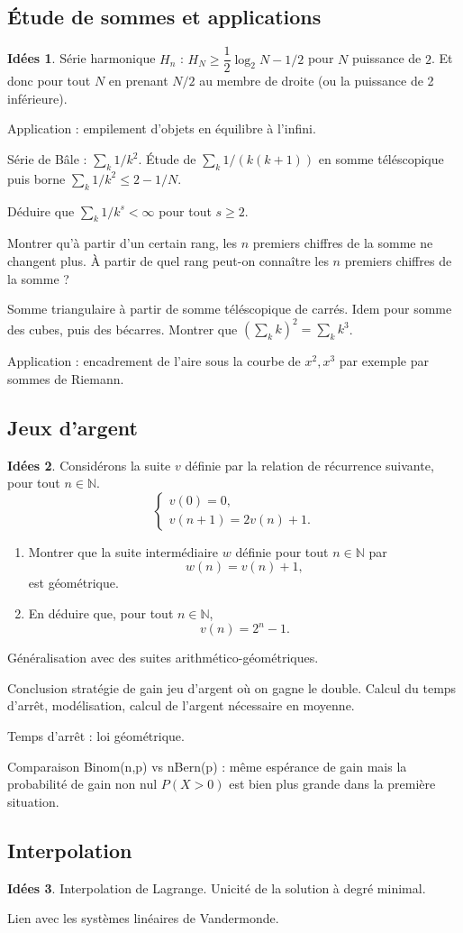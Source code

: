 \documentclass[a4paper,12pt, notitlepage]{article}
\theoremstyle{definition}
\newtheorem{idee}{Idées}
\newcommand{\N}{\mathbb{N}}
\begin{document}
\subsection{Étude de sommes et applications}

\begin{idee}	
	Série harmonique $H_n$ : $H_N \geq \dfrac12 \log_2N - 1/2$ pour $N$ puissance de $2$.
	Et donc pour tout $N$ en prenant $N/2$ au membre de droite (ou la puissance de 2 inférieure).
	
	Application : empilement d'objets en équilibre à l'infini.
	
	Série de Bâle : $\sum_k 1/k^2$. Étude de $\sum_k 1/(k(k+1))$ en somme téléscopique puis borne $\sum_k 1/k^2 \leq 2-1/N$.
	
	Déduire que $\sum_k 1/k^s < \infty$ pour tout $s \geq 2$.
	
	Montrer qu'à partir d'un certain rang, les $n$ premiers chiffres de la somme ne changent plus.	
	À partir de quel rang peut-on connaître les $n$ premiers chiffres de la somme ?
	
	Somme triangulaire à partir de somme téléscopique de carrés.
	Idem pour somme des cubes, puis des bécarres.
	Montrer que $(\sum_k k)^2 = \sum_k k^3$.

	Application : encadrement de l'aire sous la courbe de $x^2, x^3$ par exemple par sommes de Riemann.
\end{idee}

\subsection{Jeux d'argent}


\begin{idee}
	Considérons la suite $v$ définie par la relation de récurrence suivante, pour tout $n\in\N$.
    \[
    \begin{cases}
        v(0) = 0, \\
        v(n+1) = 2v(n) + 1.
    \end{cases}
    \]
    \begin{enumerate}
        \item Montrer que la suite intermédiaire $w$ définie pour tout $n\in\N$ par
            \[ w(n) = v(n) + 1,\]
        est géométrique.
        \item En déduire que, pour tout $n\in\N$,
            \[ v(n) = 2^n - 1.\]
    \end{enumerate}

	Généralisation avec des suites arithmético-géométriques.
	
	Conclusion stratégie de gain jeu d'argent où on gagne le double.
	Calcul du temps d'arrêt, modélisation, calcul de l'argent nécessaire en moyenne.
	
	Temps d'arrêt : loi géométrique.
	
	Comparaison Binom(n,p) vs nBern(p) : même espérance de gain mais la probabilité de gain non nul $P(X>0)$ est bien plus grande dans la première situation.
\end{idee}

\subsection{Interpolation}

\begin{idee}
	Interpolation de Lagrange.
	Unicité de la solution à degré minimal.
	
	Lien avec les systèmes linéaires de Vandermonde.
\end{idee}
\end{document}
